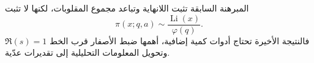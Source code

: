 \begin{remark}
المبرهنة السابقة تثبت اللانهاية وتباعد مجموع المقلوبات، لكنها لا تثبت
\[
\pi(x;q,a)\sim\frac{\operatorname{Li}(x)}{\varphi(q)}.
\]
فالنتيجة الأخيرة تحتاج أدوات كمية إضافية، أهمها ضبط الأصفار قرب الخط
\(\Re(s)=1\) وتحويل المعلومات التحليلية إلى تقديرات عدّية.
\end{remark}
